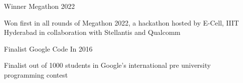
\begin{cventries}

  \cventry
    {Winner} %
    {Megathon} %
    {} %
    {2022} %
    {
      \begin{cvitems} %
		\item{Won first in all rounds of Megathon 2022, a hackathon hosted by E-Cell, IIIT Hyderabad in collaboration with Stellantis and Qualcomm}
      \end{cvitems}
    }
	\cventry
    {Finalist} %
    {Google Code In} %
    {} %
    {2016} %
    {
      \begin{cvitems} %
		\item{Finalist out of 1000 students in Google's international pre university programming contest}
      \end{cvitems}
    }
\end{cventries}
